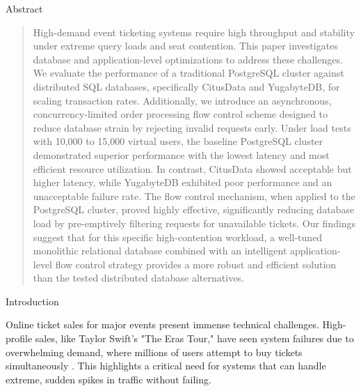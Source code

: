 \documentclass[a0,landscape]{config/poster/a0poster}
\newcommand{\postersection}[1]{%
  \begin{tcolorbox}[
      colback=IEEEblue,
      colframe=IEEEblue,
      fonttitle=\bfseries,
      coltext=white,
      sharp corners,
      boxrule=0pt,
      top=4pt,
      bottom=4pt,
      halign=center
    ]
    \large #1
  \end{tcolorbox}%
}
\begin{document}
\begin{multicols}{4} %


	\postersection{Abstract}
	\begin{quote}
		High-demand event ticketing systems require high throughput and stability under extreme query loads and seat contention. This paper investigates database and application-level optimizations to address these challenges. We evaluate the performance of a traditional PostgreSQL cluster against distributed SQL databases, specifically CitusData and YugabyteDB, for scaling transaction rates. Additionally, we introduce an asynchronous, concurrency-limited order processing flow control scheme designed to reduce database strain by rejecting invalid requests early. Under load tests with 10,000 to 15,000 virtual users, the baseline PostgreSQL cluster demonstrated superior performance with the lowest latency and most efficient resource utilization. In contrast, CitusData showed acceptable but higher latency, while YugabyteDB exhibited poor performance and an unacceptable failure rate. The flow control mechanism, when applied to the PostgreSQL cluster, proved highly effective, significantly reducing database load by pre-emptively filtering requests for unavailable tickets. Our findings suggest that for this specific high-contention workload, a well-tuned monolithic relational database combined with an intelligent application-level flow control strategy provides a more robust and efficient solution than the tested distributed database alternatives.
	\end{quote}


	\postersection{Introduction}
	Online ticket sales for major events present immense technical challenges. High-profile sales, like Taylor Swift's "The Eras Tour," have seen system failures due to overwhelming demand, where millions of users attempt to buy tickets simultaneously \cite{swiftTicketmaster}. This highlights a critical need for systems that can handle extreme, sudden spikes in traffic without failing.


\end{multicols}
\end{document}
